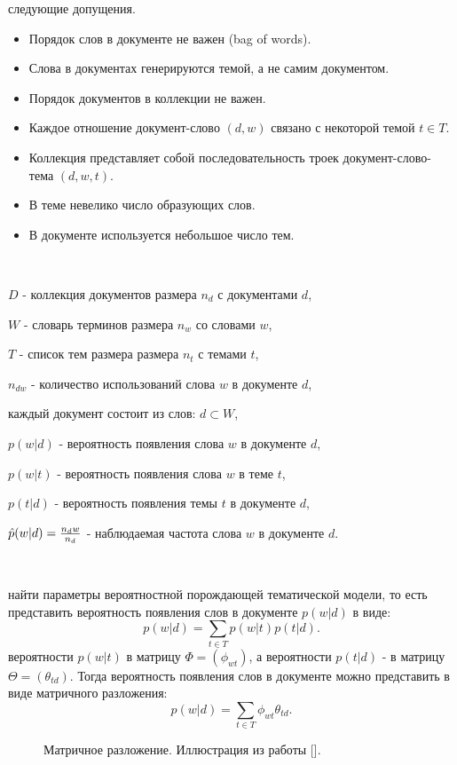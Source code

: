  следующие допущения.

\begin{itemize}
    \item Порядок слов в документе не важен (bag of words).
    \item Слова в документах генерируются темой, а не самим документом.
    \item Порядок документов в коллекции не важен.
    \item Каждое отношение документ-слово $(d,w)$ связано с некоторой темой $t \in T$.
    \item Коллекция представляет собой последовательность троек документ-слово-тема $(d,w,t)$.
    \item В теме невелико число образующих слов.
    \item В документе используется небольшое число тем.
\end{itemize}

~\



 $D$ - коллекция документов размера $n_d$ с документами $d$,

 $W$ - словарь терминов размера $n_w$ со словами $w$,

 $T$ - список тем размера размера $n_t$ с темами $t$,

 $n_{dw}$ - количество использований слова $w$ в документе $d$,

 каждый документ состоит из слов: $d \subset W$,

 $p(w|d)$ - вероятность появления слова $w$ в документе $d$,

 $p(w|t)$ - вероятность появления слова $w$ в теме $t$,

 $p(t|d)$ - вероятность появления темы $t$ в документе $d$,

 $\hat{p}(w|d) = {{n_dw}\over{n_d}}$ - наблюдаемая частота слова $w$ в документе $d$.

~\

 найти параметры вероятностной порождающей тематической модели, то есть представить вероятность появления слов в документе $p(w|d)$ в виде:
$$
p(w|d) = \sum_{t \in T}{ p(w|t) p(t|d) }.
$$
 вероятности $p(w|t)$ в матрицу $\Phi=(\phi_{wt})$, а вероятности $p(t|d)$ - в матрицу $\Theta=(\theta_{td})$. Тогда вероятность появления слов в документе можно представить в виде матричного разложения:
$$
p(w|d) = \sum_{t \in T}{ \phi_{wt} \theta_{td} }.
$$

\begin{figure}[h]
\caption{Матричное разложение. Иллюстрация из работы [].}
\label{fig:image}
\end{figure}
\todo{}

